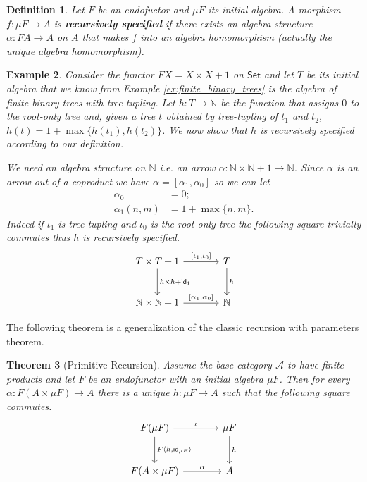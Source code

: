 \documentclass[letterpaper, 11pt, oneside]{memoir}
\theoremstyle{myteo}
\newtheorem{theorem}{Theorem}[section]
\newtheorem{definition}[theorem]{Definition}
\newtheorem{example}[theorem]{Example}
\numberwithin{equation}{section}
\newcommand{\marginnote}[1]{\marginpar{\footnotesize #1}}
\newcommand{\id}{\textsf{id}}
\newcommand{\Set}{\textsf{Set}}
\newcommand{\N}{\mathbb{N}}
\newcommand{\outofcoprod}[2]{{[#1, #2]}}
\newcommand{\intoprod}[2]{{\langle #1, #2\rangle}}
\begin{document}
\begin{definition}
  Let \(F\) be an endofuctor and \(\mu F\) its initial algebra.
  A morphism \(f \colon \mu F \to A\) is \textbf{recursively specified} \marginnote{recursively specified} if there exists an algebra structure \(\alpha \colon FA \to A\) on \(A\) that makes \(f\) into an algebra homomorphism (actually the unique algebra homomorphism).
\end{definition}

\begin{example}
  Consider the functor \(FX = X \times X + 1\) on \(\Set\) and let \(T\) be its initial algebra that we know from Example \ref{ex:finite_binary_trees} is the algebra of finite binary trees with tree-tupling.
  Let \(h \colon T \to \mathbb{N}\) be the function that assigns \(0\) to the root-only tree and, given a tree \(t\) obtained by tree-tupling of \(t_1\) and \(t_2\), \(h(t) = 1 + \max\{h(t_1), h(t_2)\}\).
  We now show that \(h\) is recursively specified according to our definition.

  We need an algebra structure on \(\mathbb{N}\) i.e. an arrow \(\alpha \colon \N \times \N + 1 \to \N\).
  Since \(\alpha\) is an arrow out of a coproduct we have \(\alpha = [\alpha_1, \alpha_0]\) so we can let
  \begin{align*}
    \alpha_0 &= 0;\\
    \alpha_1(n, m) &= 1 + \max\{n, m\}.
  \end{align*}
  Indeed if \(\iota_1\) is tree-tupling and \(\iota_0\) is the root-only tree the following square trivially commutes thus \(h\) is recursively specified.
  \begin{equation*}
    \begin{tikzcd}[sep = large]
      T \times T + 1 \ar[r, "\outofcoprod{\iota_1}{\iota_0}"] \ar[d, "h \times h + \id_1"] & T \ar[d, "h"]\\
      \N \times \N + 1 \ar[r, "\outofcoprod{\alpha_1}{\alpha_0}"] & \N
    \end{tikzcd}
  \end{equation*}
\end{example}

The following theorem is a generalization of the classic recursion with parameters theorem.

\begin{theorem}[Primitive Recursion]
  \label{teo:primitive_recursion}
  Assume the base category \(\mathscr{A}\) to have finite products and let \(F\) be an endofunctor with an initial algebra \(\mu F\).
  Then for every \(\alpha \colon F(A \times \mu F) \to A\) there is a unique \(h \colon \mu F \to A\) such that the following square commutes.
  \begin{equation}
    \label{dia:recursion}
    \begin{tikzcd}[sep = large]
      F(\mu F) \ar[r, "\iota"] \ar[d, "F \intoprod{h}{\id_{\mu F}}"] & \mu F \ar[d, "h"] \\
      F(A \times \mu F) \ar[r, "\alpha"] & A
    \end{tikzcd}
  \end{equation}
\end{theorem}
\end{document}
